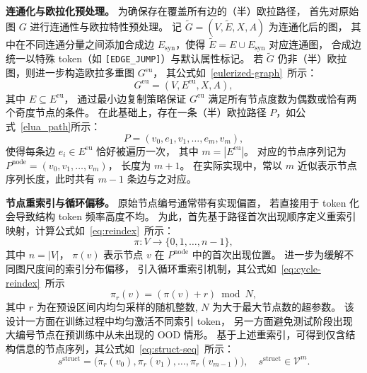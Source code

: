 \textbf{连通化与欧拉化预处理。}
为确保存在覆盖所有边的（半）欧拉路径，
首先对原始图 \(G\) 进行连通性与欧拉特性预处理。
记 \(\tilde{G} = (V, \tilde{E}, X, A)\) 为连通化后的图，
其中在不同连通分量之间添加合成边
\(E_{\mathrm{syn}}\)，使得
\(
\tilde{E} = E \cup E_{\mathrm{syn}}
\)
对应连通图，
合成边统一以特殊 token（如 \texttt{[EDGE\_JUMP]}）与默认属性标记。
若 \(\tilde{G}\) 仍非（半）欧拉图，则进一步构造欧拉多重图 \(G^{\mathrm{eu}}\)，
其公式如~\ref{eulerized-graph}\ 所示：
\begin{equation}
    G^{\mathrm{eu}} = (V, E^{\mathrm{eu}}, X, A),
    \label{eulerized-graph}
\end{equation}
其中
\(E \subseteq E^{\mathrm{eu}}\)，
通过最小边复制策略保证
\(G^{\mathrm{eu}}\) 满足所有节点度数为偶数或恰有两个奇度节点的条件。
在此基础上，存在一条（半）欧拉路径 $P$，如公式~\ref{elua_path}所示：
\begin{equation}
    P = (v_0, e_1, v_1, \dots, e_m, v_m),
    \label{elua_path}
\end{equation}
使得每条边 \(e_i \in E^{\mathrm{eu}}\) 恰好被遍历一次，
其中 \(m = |E^{\mathrm{eu}}|\)。
对应的节点序列记为
\(
P^{\mathrm{node}} = (v_0, v_1, \dots, v_m)
\)，
长度为 \(m+1\)。
在实际实现中，常以 \(m\) 近似表示节点序列长度，此时共有 \(m-1\) 条边与之对应。

\textbf{节点重索引与循环偏移。}
原始节点编号通常带有实现偏置，
若直接用于 token 化会导致结构 token 频率高度不均。
为此，首先基于路径首次出现顺序定义重索引映射，计算公式如~\ref{eq:reindex}\ 所示：
\begin{equation}
    \pi: V \rightarrow \{0, 1, \dots, n-1\},
    \label{eq:reindex}
\end{equation}
其中 \(n = |V|\)，
\(\pi(v)\) 表示节点 \(v\) 在 \(P^{\mathrm{node}}\) 中的首次出现位置。
进一步为缓解不同图尺度间的索引分布偏移，
引入循环重索引机制，其公式如~\ref{eq:cycle-reindex}\ 所示
\begin{equation}
    \pi_r(v) = (\pi(v) + r) \bmod N,
    \label{eq:cycle-reindex}
\end{equation}
其中 \(r\) 为在预设区间内均匀采样的随机整数,
\(N\) 为大于最大节点数的超参数。
该设计一方面在训练过程中均匀激活不同索引 token，
另一方面避免测试阶段出现大编号节点在预训练中从未出现的 OOD 情形。
基于上述重索引，可得到仅含结构信息的节点序列，其公式如~\ref{eq:struct-seq}\ 所示：
\begin{equation}
    s^{\mathrm{struct}} = 
    \big(\pi_r(v_0), \pi_r(v_1), \dots, \pi_r(v_{m-1})\big),
    \quad s^{\mathrm{struct}} \in \mathcal{V}^m.
    \label{eq:struct-seq}
\end{equation}

